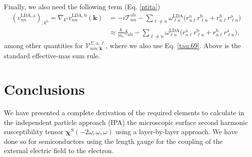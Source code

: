 Finally,
we also need the following term (Eq. \eqref{ntita})
\begin{align}\label{a.3c}
(v^{\mathrm{LDA},\mathrm{a}}_{nn})_{;k^\mathrm{b}}
=
\nabla_{k^{\mathrm{a}}}  
v^{\mathrm{LDA},\mathrm{b}}_{nn}(\mathbf{k})
&=
-i\mathcal{T}^{\mathrm{a}\mathrm{b}}_{nn}
-
\sum_{\ell\ne n}
\omega^{\mathrm{LDA}}_{\ell n}
\bigg(  
r^{\mathrm{a}}_{n\ell}  
r^{\mathrm{b}}_{\ell n}
+  
r^{\mathrm{b}}_{n\ell}  
r^{\mathrm{a}}_{\ell n}
\bigg)
\nonumber\\
&\approx
\frac{\hbar}{m_{e}}\delta_{\mathrm{a}\mathrm{b}}
-
\sum_{\ell\ne n}
\omega^{\mathrm{LDA}}_{\ell n}
\bigg(  
r^{\mathrm{a}}_{n\ell}  
r^{\mathrm{b}}_{\ell n}
+  
r^{\mathrm{b}}_{n\ell}  
r^{\mathrm{a}}_{\ell n}
\bigg)
,
\end{align}  
among other quantities for $\mathcal{V}^{\Sigma,\mathrm{a},\ell}_{nm;\mathbf{k}}$, where we 
also use Eq. \eqref{tau.69}. Above is the standard effective-mas sum rule.
\cite{ashcroftbook} 


\section{Conclusions}\label{con}

We have presented a complete derivation of the required elements to
calculate in the independent particle approach (IPA) the microscopic  
surface second harmonic susceptibility tensor $\boldsymbol{\chi}^S(-2\omega;\omega,\omega)$ 
using a layer-by-layer approach. We have done so for semiconductors using 
the length gauge for the coupling of the external electric field to the 
electron. 

\stopcontents[chapters]

